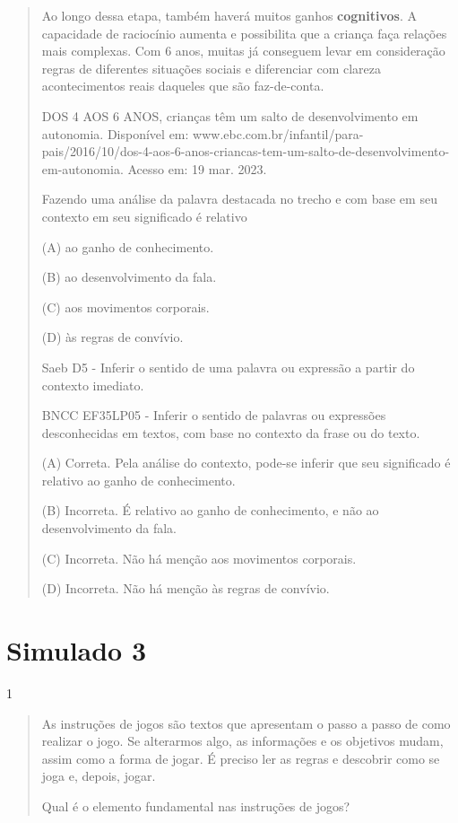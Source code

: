 \begin{escolha}
\begin{escolha}
{\begin{quote}
Ao longo dessa etapa, também haverá muitos ganhos \textbf{cognitivos}. A
capacidade de raciocínio aumenta e possibilita que a criança faça
relações mais complexas. Com 6 anos, muitas já conseguem levar em
consideração regras de diferentes situações sociais e diferenciar com
clareza acontecimentos reais daqueles que são faz-de-conta.

DOS 4 AOS 6 ANOS, crianças têm um salto de desenvolvimento em autonomia.
Disponível em:
www.ebc.com.br/infantil/para-pais/2016/10/dos-4-aos-6-anos-criancas-tem-um-salto-de-desenvolvimento-em-autonomia.
Acesso em: 19 mar. 2023.

Fazendo uma análise da palavra destacada no trecho e com base em seu
contexto em seu significado é relativo

(A) ao ganho de conhecimento.

(B) ao desenvolvimento da fala.

(C) aos movimentos corporais.

(D) às regras de convívio.

Saeb D5 - Inferir o sentido de uma palavra ou expressão a partir do
contexto imediato.

BNCC EF35LP05 - Inferir o sentido de palavras ou expressões
desconhecidas em textos, com base no contexto da frase ou do texto.

(A) Correta. Pela análise do contexto, pode-se inferir que seu
significado é relativo ao ganho de conhecimento.

(B) Incorreta. É relativo ao ganho de conhecimento, e não ao
desenvolvimento da fala.

(C) Incorreta. Não há menção aos movimentos corporais.

(D) Incorreta. Não há menção às regras de convívio.
\end{quote}

\chapter{Simulado 3}

\num{1}

\begin{quote}
As instruções de jogos são textos que apresentam o passo a passo de como
realizar o jogo. Se alterarmos algo, as informações e os objetivos
mudam, assim como a forma de jogar. É preciso ler as regras e descobrir
como se joga e, depois, jogar.

Qual é o elemento fundamental nas instruções de jogos?


\end{quote}}
\end{escolha}
\end{escolha}
